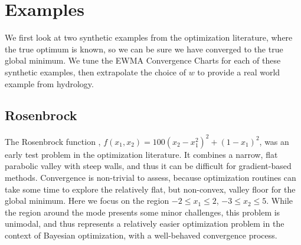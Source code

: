 \documentclass{article}
\begin{document}
\section{Examples}
\label{sec:examples}
%
We first look at two synthetic examples from the optimization literature, 
where the true optimum is known, so we can be sure we have converged to the 
true global minimum. We tune the EWMA Convergence Charts for each of these 
synthetic examples, then extrapolate the choice of $w$ to provide a real world 
example from hydrology.

%
%
\subsection{Rosenbrock}
%
%


%
The Rosenbrock function \citep{rosePaper}, $f(x_1, x_2) =
100\left(x_2-x_1^2\right)^2 + (1-x_1)^2$, was an early test problem in the 
optimization literature. It combines a narrow, flat parabolic valley with 
steep walls, and thus it can be difficult for gradient-based methods. 
Convergence is non-trivial to assess, because optimization routines 
can take some time to explore the relatively flat, but non-convex, valley 
floor for the global minimum. Here we focus on the region $-2\le x_1\le2$, 
$-3\le x_2\le5$. While the region around the mode presents some minor 
challenges, this problem is unimodal, and thus represents a relatively easier 
optimization problem in the context of Bayesian optimization, with 
a well-behaved convergence process.
\end{document}
